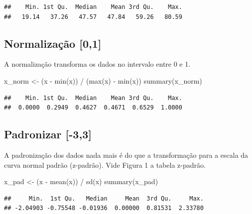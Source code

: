 \documentclass[
]{article}
\newenvironment{Shaded}{\begin{snugshade}}{\end{snugshade}}
\newcommand{\FunctionTok}[1]{\textcolor[rgb]{0.00,0.00,0.00}{#1}}
\newcommand{\NormalTok}[1]{#1}
\newcommand{\OtherTok}[1]{\textcolor[rgb]{0.56,0.35,0.01}{#1}}
\newcommand{\SpecialCharTok}[1]{\textcolor[rgb]{0.00,0.00,0.00}{#1}}
\begin{document}
\begin{verbatim}
##    Min. 1st Qu.  Median    Mean 3rd Qu.    Max. 
##   19.14   37.26   47.57   47.84   59.26   80.59
\end{verbatim}

\hypertarget{normalizauxe7uxe3o-01}{%
\subsection{Normalização {[}0,1{]}}\label{normalizauxe7uxe3o-01}}

A normalização transforma os dados no intervalo entre 0 e 1.

\begin{Shaded}
\begin{Highlighting}[]
\NormalTok{x\_norm }\OtherTok{\textless{}{-}}\NormalTok{ (x }\SpecialCharTok{{-}} \FunctionTok{min}\NormalTok{(x)) }\SpecialCharTok{/}\NormalTok{ (}\FunctionTok{max}\NormalTok{(x) }\SpecialCharTok{{-}} \FunctionTok{min}\NormalTok{(x))}
\FunctionTok{summary}\NormalTok{(x\_norm)}
\end{Highlighting}
\end{Shaded}

\begin{verbatim}
##    Min. 1st Qu.  Median    Mean 3rd Qu.    Max. 
##  0.0000  0.2949  0.4627  0.4671  0.6529  1.0000
\end{verbatim}

\hypertarget{padronizar--33}{%
\subsection{Padronizar {[}-3,3{]}}\label{padronizar--33}}

A padronização dos dados nada mais é do que a transformação para a
escala da curva normal padrão (z-padrão). Vide Figura 1 a tabela
z-padrão.

\begin{Shaded}
\begin{Highlighting}[]
\NormalTok{x\_pad }\OtherTok{\textless{}{-}}\NormalTok{ (x }\SpecialCharTok{{-}} \FunctionTok{mean}\NormalTok{(x)) }\SpecialCharTok{/} \FunctionTok{sd}\NormalTok{(x)}
\FunctionTok{summary}\NormalTok{(x\_pad)}
\end{Highlighting}
\end{Shaded}

\begin{verbatim}
##     Min.  1st Qu.   Median     Mean  3rd Qu.     Max. 
## -2.04903 -0.75548 -0.01936  0.00000  0.81531  2.33780
\end{verbatim}
\end{document}
